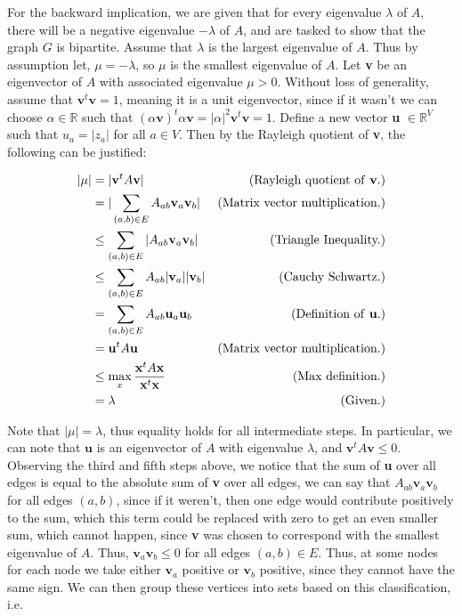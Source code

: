 \documentclass[10pt]{article}
\newcommand{\1}{\vec{\mathbbm{1}}}
\begin{document}
{\newpage
For the backward implication, we are given that for every eigenvalue $\lambda$ of $A$, there will be a negative eigenvalue $-\lambda$ of $A$, and are tasked to show that the graph $G$ is bipartite. Assume that $\lambda$ is the largest eigenvalue of $A$. Thus by assumption let, $\mu = -\lambda$, so $\mu$ is the smallest eigenvalue of $A$. Let \textbf{v} be an eigenvector of $A$ with associated eigenvalue $\mu > 0$. Without loss of generality, assume that $\textbf{v}^t\textbf{v} = 1$, meaning it is a unit eigenvector, since if it wasn't we can choose $\alpha \in \mathbb{R}$ such that $(\alpha\textbf{v})^t\alpha\textbf{v} = |\alpha|^2 \textbf{v}^t\textbf{v} = 1$.  Define a new vector \textbf{u} $\in \mathbb{R}^V$ such that $u_a = |z_a|$ for all $a \in V$. Then by the Rayleigh quotient of \textbf{v}, the following can be justified:

\vspace{-15mm}
{
\begin{align}
    |\mu| &= |\textbf{v}^tA\textbf{v}| &\text{(Rayleigh quotient of \textbf{v}.)}\nonumber\\
    &= |\sum_{(a, b) \in E} A_{ab}\textbf{v}_a\textbf{v}_b| &\text{(Matrix vector multiplication.)}\nonumber\\
    &\leq \sum_{(a, b) \in E} |A_{ab}\textbf{v}_a\textbf{v}_b| &\text{(Triangle Inequality.)}\nonumber\\
    &\leq \sum_{(a, b) \in E} A_{ab}|\textbf{v}_a||\textbf{v}_b| &\text{(Cauchy Schwartz.)}\nonumber\\
    &= \sum_{(a, b) \in E} A_{ab}\textbf{u}_a\textbf{u}_b &\text{(Definition of \textbf{u}.)}\nonumber\\
    &= \textbf{u}^tA\textbf{u} &\text{(Matrix vector multiplication.)}\nonumber\\
    &\leq \max_x \frac{\textbf{x}^tA\textbf{x}}{\textbf{x}^t\textbf{x}} &\text{(Max definition.)}\nonumber\\
    &= \lambda &\text{(Given.)}\nonumber
\end{align}
}

Note that $|\mu| = \lambda$, thus equality holds for all intermediate steps. In particular, we can note that $\textbf{u}$ is an eigenvector of $A$ with eigenvalue $\lambda$, and $\textbf{v}^tA\textbf{v} \leq 0$. Observing the third and fifth steps above, we notice that the sum of \textbf{u} over all edges is equal to the absolute sum of \textbf{v} over all edges, we can say that $A_{ab}\textbf{v}_a \textbf{v}_b$ for all edges $(a, b)$, since if it weren't, then one edge would contribute positively to the sum, which this term could be replaced with zero to get an even smaller sum, which cannot happen, since \textbf{v} was chosen to correspond with the smallest eigenvalue of $A$. Thus, $\textbf{v}_a \textbf{v}_b \leq 0$ for all edges $(a, b) \in E$. Thus, at some nodes for each node we take either $\textbf{v}_a$ positive or $\textbf{v}_b$ positive, since they cannot have the same sign. We can then group these vertices into sets based on this classification, i.e.

}
\end{document}
